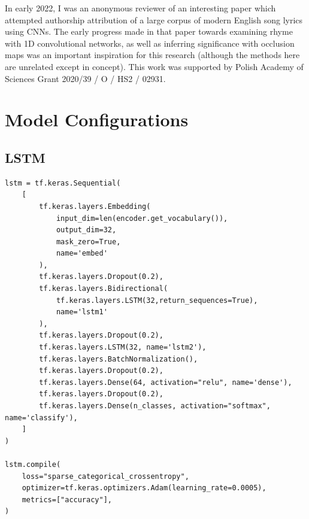 \documentclass[
    twocolumn,
    hf,
]{ceurart}
\begin{document}
\begin{acknowledgments}
    In early 2022, I was an anonymous reviewer of an interesting paper
    \cite{yilmaz_scheffler_22} which attempted authorship attribution of a large
    corpus of modern English song lyrics using CNNs. The early progress made in
    that paper towards examining rhyme with 1D convolutional networks, as well
    as inferring significance with occlusion maps was an important inspiration
    for this research (although the methods here are unrelated except in
    concept). This work was supported by Polish Academy of Sciences Grant
    2020/39 / O / HS2 / 02931.
\end{acknowledgments}



\appendix
\onecolumn
\section{Model Configurations}
\subsection{LSTM}\label{app:lstm}
\begin{verbatim}
lstm = tf.keras.Sequential(
    [
        tf.keras.layers.Embedding(
            input_dim=len(encoder.get_vocabulary()),
            output_dim=32,
            mask_zero=True,
            name='embed'
        ),
        tf.keras.layers.Dropout(0.2),
        tf.keras.layers.Bidirectional(
            tf.keras.layers.LSTM(32,return_sequences=True),
            name='lstm1'
        ),
        tf.keras.layers.Dropout(0.2),
        tf.keras.layers.LSTM(32, name='lstm2'),
        tf.keras.layers.BatchNormalization(),
        tf.keras.layers.Dropout(0.2),
        tf.keras.layers.Dense(64, activation="relu", name='dense'),
        tf.keras.layers.Dropout(0.2),
        tf.keras.layers.Dense(n_classes, activation="softmax", name='classify'),
    ]
)

lstm.compile(
    loss="sparse_categorical_crossentropy",
    optimizer=tf.keras.optimizers.Adam(learning_rate=0.0005),
    metrics=["accuracy"],
)
\end{verbatim}
\end{document}

